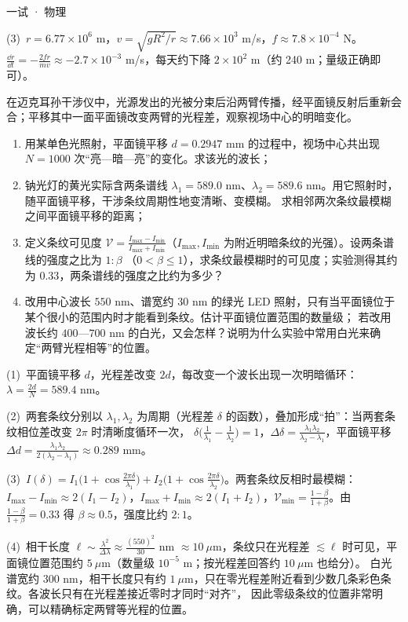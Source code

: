 \documentclass[cjk=noto, seal=first]{mojing-exam}
\begin{document}
\begin{paper}[time={建议 2 小时（训练设置）}, full=100]{一试 · 物理}
\begin{questions}
\begin{solution}
(3)~$r=6.77\times10^6$ m，$v=\sqrt{gR^2/r}\approx7.66\times10^3$ m/s，$f\approx7.8\times10^{-4}$ N。
$\frac{\dd r}{\dd t}=-\frac{2fr}{mv}\approx-2.7\times10^{-3}$ m/s，每天约下降 $2\times10^2$ m（约 240 m；量级正确即可）。
\end{solution}

\question[20]
在迈克耳孙干涉仪中，光源发出的光被分束后沿两臂传播，经平面镜反射后重新会合；平移其中一面平面镜改变两臂的光程差，观察视场中心的明暗变化。
\begin{enumerate}
  \item 用某单色光照射，平面镜平移 $d=0.2947$ mm 的过程中，视场中心共出现 $N=1000$ 次“亮—暗—亮”的变化。求该光的波长；
  \item 钠光灯的黄光实际含两条谱线 $\lambda_1=589.0$ nm、$\lambda_2=589.6$ nm。用它照射时，随平面镜平移，干涉条纹周期性地变清晰、变模糊。
        求相邻两次条纹最模糊之间平面镜平移的距离；
  \item 定义条纹可见度 $\mathcal V=\frac{I_{\max}-I_{\min}}{I_{\max}+I_{\min}}$（$I_{\max},I_{\min}$ 为附近明暗条纹的光强）。设两条谱线的强度之比为 $1:\beta$
        （$0<\beta\le1$），求条纹最模糊时的可见度；实验测得其约为 $0.33$，两条谱线的强度之比约为多少？
  \item 改用中心波长 $550$ nm、谱宽约 $30$ nm 的绿光 LED 照射，只有当平面镜位于某个很小的范围内时才能看到条纹。估计平面镜位置范围的数量级；
        若改用波长约 $400$—$700$ nm 的白光，又会怎样？说明为什么实验中常用白光来确定“两臂光程相等”的位置。
\end{enumerate}
\answerspace{2cm}
\begin{solution}
(1)~平面镜平移 $d$，光程差改变 $2d$，每改变一个波长出现一次明暗循环：$\lambda=\frac{2d}N=589.4$ nm。

(2)~两套条纹分别以 $\lambda_1,\lambda_2$ 为周期（光程差 $\delta$ 的函数），叠加形成“拍”：当两套条纹相位差改变 $2\pi$ 时清晰度循环一次，
$\delta\bigl(\frac1{\lambda_1}-\frac1{\lambda_2}\bigr)=1$，$\Delta\delta=\frac{\lambda_1\lambda_2}{\lambda_2-\lambda_1}$，平面镜平移
$\Delta d=\frac{\lambda_1\lambda_2}{2(\lambda_2-\lambda_1)}\approx0.289$ mm。

(3)~$I(\delta)=I_1\bigl(1+\cos\frac{2\pi\delta}{\lambda_1}\bigr)+I_2\bigl(1+\cos\frac{2\pi\delta}{\lambda_2}\bigr)$。两套条纹反相时最模糊：
$I_{\max}-I_{\min}\approx2(I_1-I_2)$，$I_{\max}+I_{\min}\approx2(I_1+I_2)$，$\mathcal V_{\min}=\frac{1-\beta}{1+\beta}$。由 $\frac{1-\beta}{1+\beta}=0.33$ 得
$\beta\approx0.5$，强度比约 $2:1$。

(4)~相干长度 $\ell\sim\frac{\lambda^2}{\Delta\lambda}\approx\frac{(550)^2}{30}$ nm $\approx10\ \mu$m，条纹只在光程差 $\lesssim\ell$ 时可见，平面镜位置范围约
$5\ \mu$m（数量级 $10^{-5}$ m；按光程差回答约 $10\ \mu$m 也给分）。
白光谱宽约 $300$ nm，相干长度只有约 $1\ \mu$m，只在零光程差附近看到少数几条彩色条纹。各波长只有在光程差接近零时才同时“对齐”，
因此零级条纹的位置非常明确，可以精确标定两臂等光程的位置。
\end{solution}

\end{questions}
\end{paper}
\end{document}
